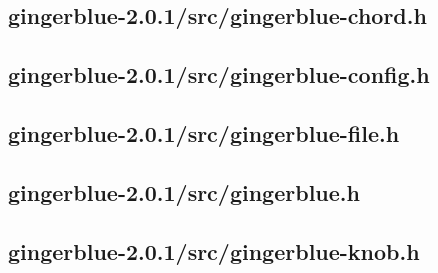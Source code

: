 \documentclass[UKenglish]{ifimaster}  %
\begin{document}
\lstset{ numbers=left, stepnumber=1, firstnumber=1, numberfirstline=true }

\subsection{gingerblue-2.0.1/src/gingerblue-chord.h}

\begin{scriptsize}
  
  

\end{scriptsize}
    
\subsection{gingerblue-2.0.1/src/gingerblue-config.h}

\begin{scriptsize}
  
  
  
\end{scriptsize}

\subsection{gingerblue-2.0.1/src/gingerblue-file.h}

\begin{scriptsize}
  
  
  
\end{scriptsize}

\subsection{gingerblue-2.0.1/src/gingerblue.h}

\begin{scriptsize}
  
  
  
\end{scriptsize}

\subsection{gingerblue-2.0.1/src/gingerblue-knob.h}
\end{document}

